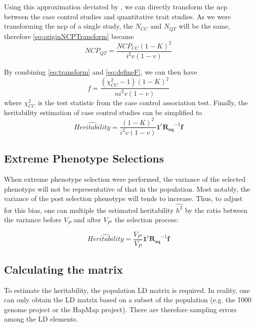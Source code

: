 			Using this approximation deviated by \citet{Yang2010}, we can directly transform the \gls{ncp} between the case control studies and quantitative trait studies.
			As we were transforming the \gls{ncp} of a single study, the $N_{CC}$ and $N_{QT}$ will be the same, therefore \cref{eq:originNCPTransform} became
			\begin{equation}
			NCP_{QT} = \frac{NCP_{CC}(1-K)^2}{i^2v(1-v)}
			\label{eq:transform}
			\end{equation}
			
			By combining \cref{eq:transform} and \cref{eq:defineF}, we can then have
			\begin{equation}
			f = \frac{(\chi^2_{CC}-1)(1-K)^2}{ni^2v(1-v)}
			\end{equation}
			where $\chi^2_{CC}$ is the test statistic from the case control association test.
			Finally, the heritability estimation of case control studies can be simplified to 
			\begin{equation}
			\hat{Heritability} =\frac{(1-K)^2}{i^2v(1-v)} \boldsymbol{1}^t\boldsymbol{R_{sq}}^{-1}\boldsymbol{f}
			\label{eq:caseControlHerit}
			\end{equation}
			
		\subsection{Extreme Phenotype Selections}
			When extreme phenotype selection were performed, the variance of the selected phenotype will not be representative of that in the population.
			Most notably, the variance of the post selection phenotype will tends to increase.
			Thus, to adjust for this bias, one can multiple the estimated heritability $\hat{h^2}$ by the ratio between the variance before $V_P$ and after $V_{P'}$ the selection process\citep{Sham2014}:
			
			\begin{equation}
			\hat{Heritability} = \frac{V_{P'}}{V_P}\boldsymbol{1}^t\boldsymbol{R_{sq}}^{-1}\boldsymbol{f}
			\label{eq:extremeShrek}
			\end{equation}
			
		\subsection{Calculating the  matrix}
			To estimate the heritability, the population \gls{LD} matrix is required.
			In reality, one can only obtain the \gls{LD} matrix based on a subset of the population (e.g. the 1000 genome project\citep{Project2012} or the HapMap project\citep{Altshuler2010}).
			There are therefore sampling errors among the \gls{LD} elements. 
			
